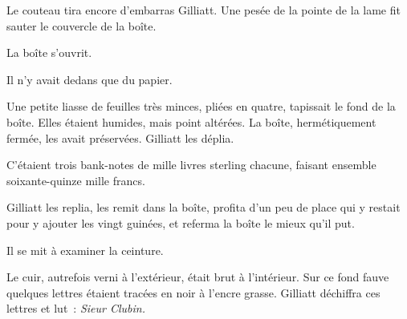 \documentclass[french,twoside]{book} %
\begin{document}
Le couteau tira encore d’embarras Gilliatt. Une pesée de la pointe de la lame fit sauter le couvercle de la boîte.\par
La boîte s’ouvrit.\par
 Il n’y avait dedans que du papier.\par
Une petite liasse de feuilles très minces, pliées en quatre, tapissait le fond de la boîte. Elles étaient humides, mais point altérées. La boîte, hermétiquement fermée, les avait préservées. Gilliatt les déplia.\par
C’étaient trois bank-notes de mille livres sterling chacune, faisant ensemble soixante-quinze mille francs.\par
Gilliatt les replia, les remit dans la boîte, profita d’un peu de place qui y restait pour y ajouter les vingt guinées, et referma la boîte le mieux qu’il put.\par
Il se mit à examiner la ceinture.\par
Le cuir, autrefois verni à l’extérieur, était brut à l’intérieur. Sur ce fond fauve quelques lettres étaient tracées en noir à l’encre grasse. Gilliatt déchiffra ces lettres et lut : \emph{Sieur Clubin.}
\end{document}
